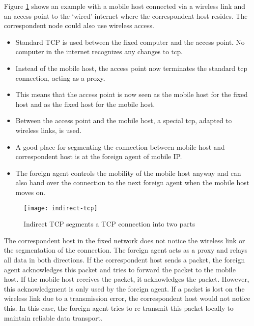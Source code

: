 Figure \ref{fig:indirect_tcp} shows an example with a mobile host connected via a wireless link and an access point to the ‘wired’ internet where the correspondent host resides. The correspondent node could also use wireless access. 
\begin{itemize}
	\item Standard TCP is used between the fixed computer and the access point. No computer in the internet recognizes any changes to \gls{tcp}. 
	\item Instead of the mobile host, the access point now terminates the standard \gls{tcp} connection, acting as a proxy. 
	\item This means that the access point is now seen as the mobile host for the fixed host and as the fixed host for the mobile host. 
	\item Between the access point and the mobile host, a special \gls{tcp}, adapted to wireless links, is used. 
	\item A good place for segmenting the connection between mobile host and correspondent host is at the foreign agent of mobile IP. 
	\item The foreign agent controls the mobility of the mobile host anyway and can also hand over the connection to the next foreign agent when the mobile host moves on. 
\end{itemize}




\begin{figure}[ht!]
	\centering
	\texttt{[image: indirect-tcp]}
	\caption{Indirect TCP segments a TCP connection into two parts}\label{fig:indirect_tcp}
\end{figure}


The correspondent host in the fixed network does not notice the wireless link or the segmentation of the connection. The foreign agent acts as a proxy and relays all data in both directions. If the correspondent host sends a packet, the foreign agent acknowledges this packet and tries to forward the packet to the mobile host. If the mobile host receives the packet, it acknowledges the packet. However, this acknowledgment is only used by the foreign agent. If a packet is lost on the wireless link due to a transmission error, the correspondent host would not notice this. In this case, the foreign agent tries to re-transmit this packet locally to maintain reliable data transport.

